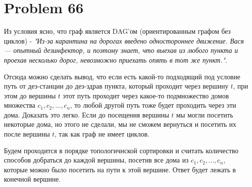 \documentclass[a4paper,12pt]{article}
\begin{document}
\section{Problem 66}

Из условия ясно, что граф является DAG'ом (ориентированным графом без циклов) - \textit{"Из-за карантина на дорогах введено одностороннее движение. Вася  — опытный дезинфектор, и поэтому знает, что выехав из любого пункта и проехав несколько дорог, невозможно приехать опять в тот же пункт."}. 

Отсюда можно сделать вывод, что если есть какой-то подходящий под условие путь от дез-станции до дез-здрав пункта, который проходит через вершину $t$, при этом до вершины $t$ этот путь проходит через какое-то подмножество домов множества $c_1,c_2,...,c_n$, то любой другой путь тоже будет проходить через эти дома. Доказать это легко. Если до посещения вершины $t$ мы могли посетить некоторые дома, но этого не сделали, мы не сможем вернуться и посетить их после вершины $t$, так как граф не имеет циклов. 

Будем проходится в порядке топологичнской сортировки и считать количество способов добраться до каждой вершины, посетив все дома из $c_1,c_2,...,c_n$, которые можно было посетить на пути к этой вершине. Ответ будет лежать в конечной вершине.
\end{document}
